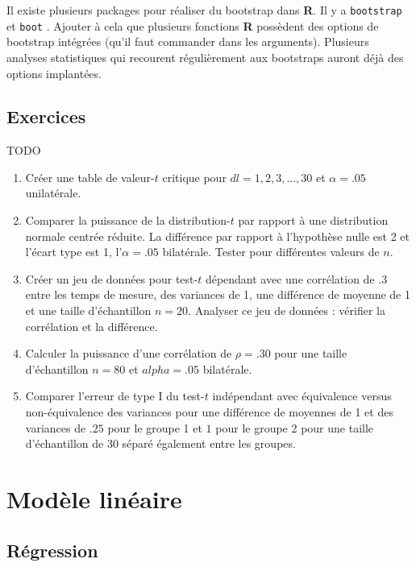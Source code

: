 \documentclass[
]{book}
\begin{document}
Il existe plusieurs packages pour réaliser du bootstrap dans \textbf{R}. Il y a \texttt{bootstrap} \autocite{bootstrap} et \texttt{boot} \autocite{Canty21}. Ajouter à cela que plusieurs fonctions \textbf{R} possèdent des options de bootstrap intégrées (qu'il faut commander dans les arguments). Plusieurs analyses statistiques qui recourent régulièrement aux bootstraps auront déjà des options implantées.

\hypertarget{exercice-analyse}{%
\chapter*{Exercices}\label{exercice-analyse}}

TODO

\begin{enumerate}
\def\labelenumi{\arabic{enumi}.}
\item
  Créer une table de valeur-\(t\) critique pour \(dl = 1,2,3 ,... ,30\) et \(\alpha=.05\) unilatérale.
\item
  Comparer la puissance de la distribution-\(t\) par rapport à une distribution normale centrée réduite. La différence par rapport à l'hypothèse nulle est 2 et l'écart type est 1, l'\(\alpha = .05\) bilatérale. Tester pour différentes valeurs de \(n\).
\item
  Créer un jeu de données pour test-\(t\) dépendant avec une corrélation de .3 entre les temps de mesure, des variances de 1, une différence de moyenne de 1 et une taille d'échantillon \(n = 20\). Analyser ce jeu de données : vérifier la corrélation et la différence.
\item
  Calculer la puissance d'une corrélation de \(\rho = .30\) pour une taille d'échantillon \(n=80\) et \(alpha = .05\) bilatérale.
\item
  Comparer l'erreur de type I du test-\(t\) indépendant avec équivalence versus non-équivalence des variances pour une différence de moyennes de 1 et des variances de \(.25\) pour le groupe 1 et \(1\) pour le groupe 2 pour une taille d'échantillon de 30 séparé également entre les groupes.
\end{enumerate}

\hypertarget{part-moduxe8le-linuxe9aire}{%
\part{Modèle linéaire}\label{part-moduxe8le-linuxe9aire}}

\hypertarget{ruxe9gression}{%
\chapter{Régression}\label{ruxe9gression}}
\end{document}
